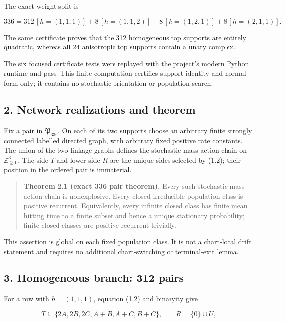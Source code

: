 The exact weight split is

\[
 336
   =312\,[h=(1,1,1)]
      +8\,[h=(1,1,2)]
      +8\,[h=(1,2,1)]
      +8\,[h=(2,1,1)].                                \tag{1.3}
\]

The same certificate proves that the 312 homogeneous top supports are
entirely quadratic, whereas all 24 anisotropic top supports contain a
unary complex.

The six focused certificate tests were replayed with the project's
modern Python runtime and pass. This finite computation certifies
support identity and normal form only; it contains no stochastic
orientation or population search.

\subsection{2. Network realizations and
theorem}

Fix a pair in \({\mathfrak P}_{336}\). On each of its two supports
choose an arbitrary finite strongly connected labelled directed graph,
with arbitrary fixed positive rate constants. The union of the two
linkage graphs defines the stochastic mass-action chain on
\(\mathbb Z_{\ge0}^3\). The side \(T\) and lower side \(R\) are the
unique sides selected by (1.2); their position in the ordered pair is
immaterial.

\begin{quote}
\textbf{Theorem 2.1 (exact 336 pair theorem).} Every such stochastic
mass-action chain is nonexplosive. Every closed irreducible population
class is positive recurrent. Equivalently, every infinite closed class
has finite mean hitting time to a finite subset and hence a unique
stationary probability; finite closed classes are positive recurrent
trivially.
\end{quote}

This assertion is global on each fixed population class. It is not a
chart-local drift statement and requires no additional chart-switching
or terminal-exit lemma.

\subsection{3. Homogeneous branch: 312
pairs}

For a row with \(h=(1,1,1)\), equation (1.2) and binaryity give

\[
 T\subseteq\{2A,2B,2C,A+B,A+C,B+C\},
 \qquad
 R=\{0\}\cup U,                                       \tag{3.1}
\]


